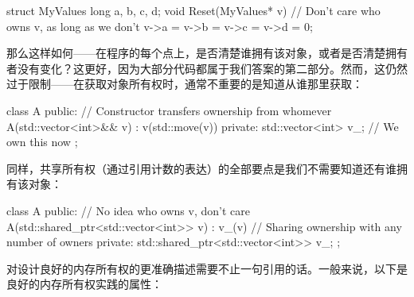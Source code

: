 \begin{code}
struct MyValues { long a, b, c, d; }
void Reset(MyValues* v) {
  // Don't care who owns v, as long as we don't
  v->a = v->b = v->c = v->d = 0;
}
\end{code}

那么这样如何——在程序的每个点上，是否清楚谁拥有该对象，或者是否清楚拥有者没有变化？这更好，因为大部分代码都属于我们答案的第二部分。然而，这仍然过于限制——在获取对象所有权时，通常不重要的是知道从谁那里获取：

\begin{code}
class A {
  public:
  // Constructor transfers ownership from whomever
  A(std::vector<int>&& v) : v(std::move(v)) {}
  private:
  std::vector<int> v_;    // We own this now
};
\end{code}

同样，共享所有权（通过引用计数的表达）的全部要点是我们不需要知道还有谁拥有该对象：

\begin{code}
class A {
  public:
  // No idea who owns v, don't care
  A(std::shared_ptr<std::vector<int>> v) : v_(v) {}
  // Sharing ownership with any number of owners
  private:
  std::shared_ptr<std::vector<int>> v_;
};
\end{code}

对设计良好的内存所有权的更准确描述需要不止一句引用的话。一般来说，以下是良好的内存所有权实践的属性：

